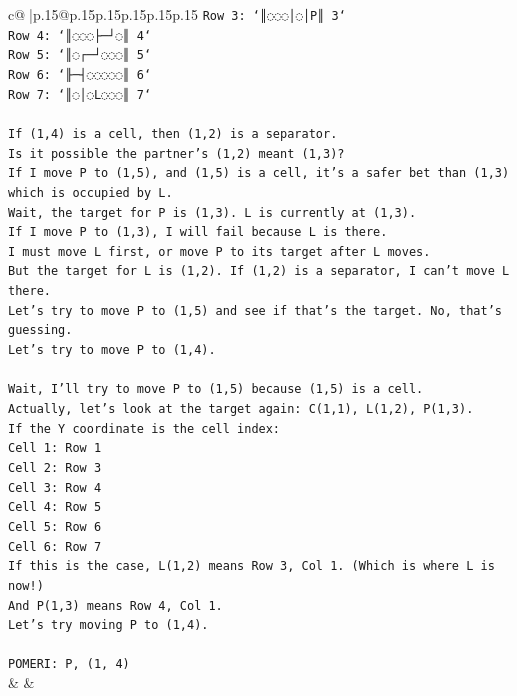 \documentclass{article}
\begin{document}
{\begin{supertabular}{c@{$\;$}|p{.15\linewidth}@{}p{.15\linewidth}p{.15\linewidth}p{.15\linewidth}p{.15\linewidth}p{.15\linewidth}}
{{{\texttt{Row 3: `║◌◌◌│◌│P║ 3`} \\
\texttt{Row 4: `║◌◌◌├─┘◌║ 4`} \\
\texttt{Row 5: `║◌┌─┘◌◌◌║ 5`} \\
\texttt{Row 6: `╟─┤◌◌◌◌◌║ 6`} \\
\texttt{Row 7: `║◌│◌L◌◌◌║ 7`} \\
\\ 
\texttt{If (1,4) is a cell, then (1,2) is a separator.} \\
\texttt{Is it possible the partner's (1,2) meant (1,3)?} \\
\texttt{If I move P to (1,5), and (1,5) is a cell, it's a safer bet than (1,3) which is occupied by L.} \\
\texttt{Wait, the target for P is (1,3). L is currently at (1,3).} \\
\texttt{If I move P to (1,3), I will fail because L is there.} \\
\texttt{I must move L first, or move P to its target after L moves.} \\
\texttt{But the target for L is (1,2). If (1,2) is a separator, I can't move L there.} \\
\texttt{Let's try to move P to (1,5) and see if that's the target. No, that's guessing.} \\
\texttt{Let's try to move P to (1,4).} \\
\\ 
\texttt{Wait, I'll try to move P to (1,5) because (1,5) is a cell.} \\
\texttt{Actually, let's look at the target again: C(1,1), L(1,2), P(1,3).} \\
\texttt{If the Y coordinate is the cell index:} \\
\texttt{Cell 1: Row 1} \\
\texttt{Cell 2: Row 3} \\
\texttt{Cell 3: Row 4} \\
\texttt{Cell 4: Row 5} \\
\texttt{Cell 5: Row 6} \\
\texttt{Cell 6: Row 7} \\
\texttt{If this is the case, L(1,2) means Row 3, Col 1. (Which is where L is now!)} \\
\texttt{And P(1,3) means Row 4, Col 1.} \\
\texttt{Let's try moving P to (1,4).} \\
\\ 
\texttt{POMERI: P, (1, 4)} \\
            }
        }
    }
    & & \\ \\


\end{supertabular}}
\end{document}

